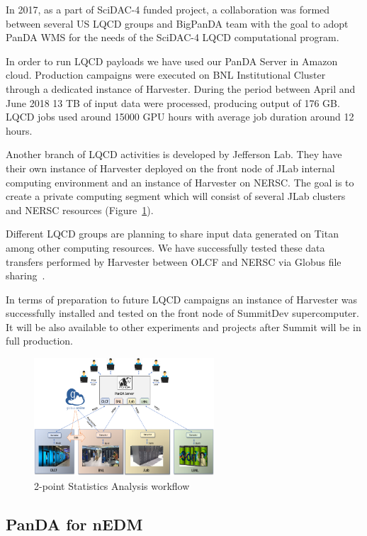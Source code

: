 \documentclass{webofc}
\begin{document}
In 2017, as a part of SciDAC-4 funded project, a collaboration was formed between several US LQCD groups and BigPanDA team with the goal to adopt PanDA WMS for the needs of the SciDAC-4 LQCD computational program.

In order to run LQCD payloads we have used our PanDA Server in Amazon cloud. Production campaigns were executed on BNL Institutional Cluster through a dedicated instance of Harvester. During the period between April and June 2018 13 TB of input data were processed, producing output of 176 GB. LQCD jobs used around 15000 GPU hours with average job duration around 12 hours.

Another branch of LQCD activities is developed by Jefferson Lab. 
They have their own instance of Harvester deployed on the front node of JLab internal computing environment and an instance of Harvester on NERSC. The goal is to create a private computing segment which will consist of several JLab clusters and NERSC resources (Figure~\ref{fig:lqcd_env}).

Different LQCD groups are planning to share input data generated on Titan among other computing resources. We have successfully tested these data transfers performed by Harvester between OLCF and NERSC via Globus file sharing~\cite{Globusdatatransfer}.

In terms of preparation to future LQCD campaigns an instance of Harvester was successfully installed and tested on the front node of SummitDev supercomputer. It will be also available to other experiments and projects after Summit will be in full production.

\begin{figure}
	\centering
	\includegraphics[width=0.60\textwidth]{figures/LQCD_future_environment.png}
	\caption{2-point Statistics Analysis workflow}
	\label{fig:lqcd_env}
\end{figure}


\subsection{PanDA for nEDM} \label{section_nedm}
\end{document}
